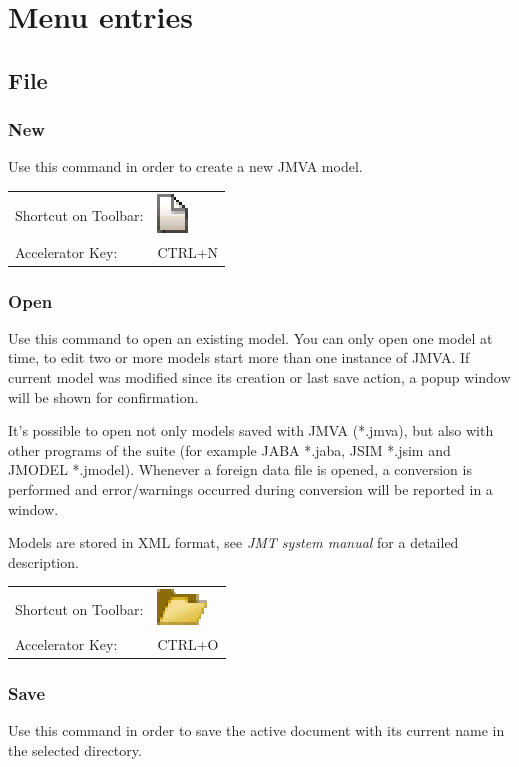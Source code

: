\section{Menu entries}
\label{sec:jmva:Menu}
\subsection{File}
\subsubsection{New}
Use this command in order to create a new JMVA model.

\noindent
\begin{tabular}{ll}
Shortcut on Toolbar: & \includegraphics[scale=.8]{img/jmva/new}\\
Accelerator Key: & CTRL+N
\end{tabular}

\subsubsection{Open}
Use this command to open an existing model. You can only open one
model at time, to edit two or more models start more than one
instance of JMVA. If current model was modified since its creation
or last save action, a popup window will be shown for confirmation.

It's possible to open not only models saved with JMVA (*.jmva), but
also with other programs of the suite (for example JABA *.jaba, JSIM
*.jsim and JMODEL *.jmodel). Whenever a foreign data file is opened, a
conversion is performed and error/warnings occurred during
conversion will be reported in a window.

Models are stored in XML format, see \emph{JMT system manual} for a
detailed description.

\noindent
\begin{tabular}{ll}
Shortcut on Toolbar: & \includegraphics[scale=.8]{img/jmva/open}\\
Accelerator Key: & CTRL+O
\end{tabular}

\subsubsection{Save}
Use this command in order to save the active document with its
current name in the selected directory.

